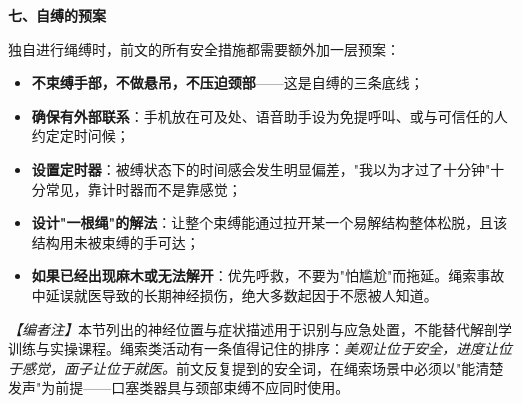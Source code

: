 \textbf{七、自缚的预案}

独自进行绳缚时，前文的所有安全措施都需要额外加一层预案：

\begin{itemize}
\item \textbf{不束缚手部，不做悬吊，不压迫颈部}——这是自缚的三条底线；
\item \textbf{确保有外部联系}：手机放在可及处、语音助手设为免提呼叫、或与可信任的人约定定时问候；
\item \textbf{设置定时器}：被缚状态下的时间感会发生明显偏差，"我以为才过了十分钟"十分常见，靠计时器而不是靠感觉；
\item \textbf{设计"一根绳"的解法}：让整个束缚能通过拉开某一个易解结构整体松脱，且该结构用未被束缚的手可达；
\item \textbf{如果已经出现麻木或无法解开}：优先呼救，不要为"怕尴尬"而拖延。绳索事故中延误就医导致的长期神经损伤，绝大多数起因于不愿被人知道。
\end{itemize}

\textit{【编者注】}本节列出的神经位置与症状描述用于识别与应急处置，不能替代解剖学训练与实操课程。绳索类活动有一条值得记住的排序：\emph{美观让位于安全，进度让位于感觉，面子让位于就医。}前文反复提到的安全词，在绳索场景中必须以"能清楚发声"为前提——口塞类器具与颈部束缚不应同时使用。

